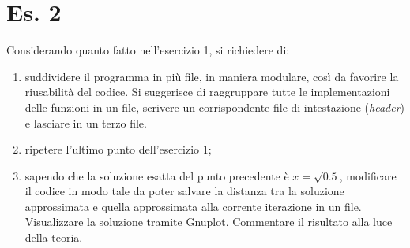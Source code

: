 \section*{Es. 2}

Considerando quanto fatto nell'esercizio 1, si richiedere di:
\begin{enumerate}

    \item suddividere il programma in pi\`u file, in maniera modulare,
        cos\`i da favorire la riusabilit\`a del codice.
        Si suggerisce di raggruppare tutte le implementazioni delle funzioni
        in un file, scrivere un corrispondente file di intestazione
        (\emph{header}) e lasciare  in un terzo file.


    \item ripetere l'ultimo punto dell'esercizio 1;

    \item sapendo che la soluzione esatta del punto precedente \`e
        $x=\sqrt{0.5}$, modificare il codice in modo tale da poter salvare
        la distanza tra la soluzione approssimata e quella approssimata
        alla corrente iterazione in un file.
        Visualizzare la soluzione tramite Gnuplot.
        Commentare il risultato alla luce della teoria.

\end{enumerate}

